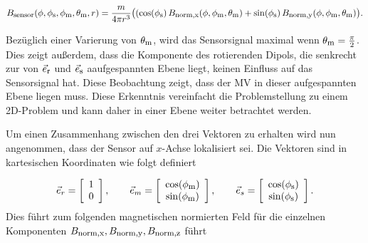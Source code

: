 \begin{equation}
    B_{\textrm{\footnotesize{sensor}}}(\phi,\phi_{\textrm{\footnotesize{s}}},\phi_{\textrm{\footnotesize{m}}},\theta_{\textrm{\footnotesize{m}}},r) =  \frac{ m }{4 \pi r^3} \big((\cos(\phi_{\textrm{\footnotesize{s}}})\, B_{\textrm{\footnotesize{norm,x}}}(\phi,\phi_{\textrm{\footnotesize{m}}},\theta_{\textrm{\footnotesize{m}}}) + \sin(\phi_{\textrm{\footnotesize{s}}})\, B_{\textrm{\footnotesize{norm,y}}}(\phi,\phi_{\textrm{\footnotesize{m}}},\theta_{\textrm{\footnotesize{m}}})\big).
    \label{eq:normSensor}
\end{equation}

Bezüglich einer Varierung von $\theta_{\textrm{\footnotesize{m}}}$, wird das Sensorsignal maximal wenn $\theta_{\textrm{\footnotesize{m}}} = \frac{\pi}{2}$. Dies zeigt außerdem, dass die Komponente des rotierenden Dipols, die senkrecht zur von $\vec{e}_{\textrm{\footnotesize{r}}}$ und $\vec{e}_{\textrm{\footnotesize{s}}}$ aaufgespannten Ebene liegt, keinen Einfluss auf das Sensorsignal hat. Diese Beobachtung zeigt, dass der MV in dieser aufgespannten Ebene liegen muss. Diese Erkenntnis vereinfacht die Problemstellung zu einem 2D-Problem und kann daher in einer Ebene weiter betrachtet werden.

Um einen Zusammenhang zwischen den drei Vektoren zu erhalten wird nun angenommen, dass der Sensor auf $x$-Achse lokalisiert sei. Die Vektoren sind in kartesischen Koordinaten wie folgt definiert

\begin{equation}
    \vec{e}_r = \left[\begin{array}{c} 1\\ 0 \end{array}\right],\qquad
    \vec{e}_m = \left[\begin{array}{c} \cos(\phi_{\textrm{\footnotesize{m}}}) \\ \sin(\phi_{\textrm{\footnotesize{m}}}) \end{array}\right],\qquad
    \vec{e}_s = \left[\begin{array}{c} \cos(\phi_{\textrm{\footnotesize{s}}})\\ \sin(\phi_{\textrm{\footnotesize{s}}})\end{array}\right].
    \label{eq:defErEmEs}
\end{equation}
Dies führt zum folgenden magnetischen normierten Feld für die einzelnen Komponenten $B_{\textrm{\footnotesize{norm,x}}},B_{\textrm{\footnotesize{norm,y}}},B_{\textrm{\footnotesize{norm,z}}}$ führt 

